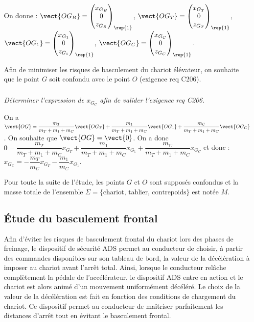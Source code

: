 \begin{multicols}{2}
On donne : 
$\vect{OG_B}=\begin{pmatrix}x_{G_B} \\ 0 \\ z_{G_B}\end{pmatrix}_{\rep{1}}$,
$\vect{OG_T}=\begin{pmatrix}x_{G_T} \\ 0 \\ z_{G_T}\end{pmatrix}_{\rep{1}}$,
$\vect{OG_1}=\begin{pmatrix}x_{G_1} \\ 0 \\ z_{G_1}\end{pmatrix}_{\rep{1}}$,
$\vect{OG_C}=\begin{pmatrix}x_{G_C} \\ 0 \\ z_{G_C}\end{pmatrix}_{\rep{1}}$.

Afin de minimiser les risques de basculement du chariot élévateur, on souhaite que le point $G$ soit
confondu avec le point $O$ (exigence req C206).
\fi


\subparagraph{}
\textit{Déterminer l’expression de $x_{G_C}$ afin de valider l'exigence req C206.}
\ifprof
\begin{corrige}
On a $\vect{OG}=\dfrac{m_T}{m_T+m_1+m_C}\vect{OG_T}+\dfrac{m_1}{m_T+m_1+m_C}\vect{OG_1}+\dfrac{m_C}{m_T+m_1+m_C}\vect{OG_C}$. On souhaite que $\vect{OG}=\vect{0}$. 
On a donc $0=\dfrac{m_T}{m_T+m_1+m_C}x_{G_T}+\dfrac{m_1}{m_T+m_1+m_C}x_{G_1}+\dfrac{m_C}{m_T+m_1+m_C}x_{G_C}$ et donc : $x_{G_C}=-\dfrac{m_T}{m_C}x_{G_T}-\dfrac{m_1}{m_C}x_{G_1}$.
\end{corrige}
\else
\fi


Pour toute la suite de l’étude, les points $G$ et $O$ sont supposés confondus et la masse totale de
l’ensemble $\Sigma =  \{\text{chariot, tablier, contrepoids}\}$ est notée $M$.

\subsection*{Étude du basculement frontal}
\ifprof
\else
Afin d’éviter les risques de basculement frontal du chariot lors des phases de freinage, le dispositif de
sécurité ADS permet au conducteur de choisir, à partir des commandes disponibles sur son tableau de
bord, la valeur de la décélération à imposer au chariot avant l’arrêt total. Ainsi, lorsque le conducteur
relâche complètement la pédale de l’accélérateur, le dispositif ADS entre en action et le chariot est
alors animé d’un mouvement uniformément décéléré. Le choix de la valeur de la décélération est fait
en fonction des conditions de chargement du chariot. Ce dispositif permet au conducteur de maîtriser
parfaitement les distances d’arrêt tout en évitant le basculement frontal.


\end{multicols}
